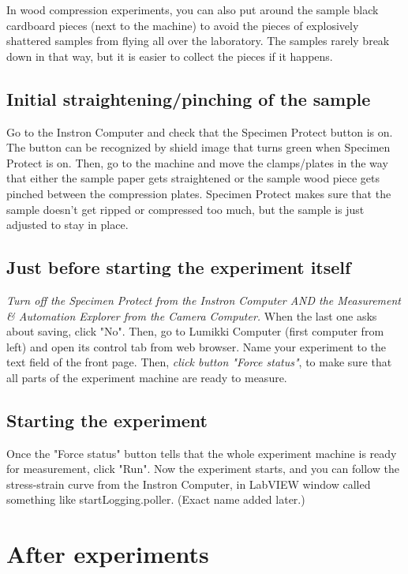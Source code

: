 \documentclass[a4paper]{article}
\begin{document}
In wood compression experiments, you can also put around the sample black cardboard 
pieces (next to the machine) to avoid the pieces of explosively shattered samples 
from flying all over the laboratory. The samples rarely break down in that way, 
but it is easier to collect the pieces if it happens.

\subsection{Initial straightening/pinching of the sample} 

Go to the Instron Computer and check that the Specimen Protect button is on. 
The button can be recognized by shield image that turns green when Specimen 
Protect is on. Then, go to the machine and move the clamps/plates in the way 
that either the sample paper gets straightened or the sample wood piece gets 
pinched between the compression plates. Specimen Protect makes sure that the 
sample doesn't get ripped or compressed too much, but the sample is just 
adjusted to stay in place.

\subsection{Just before starting the experiment itself} 

\textit{Turn off the Specimen Protect from the Instron Computer AND the Measurement 
\& Automation Explorer from the Camera Computer.} When the last one asks about 
saving, click "No". Then, go to Lumikki Computer (first computer from left) and 
open its control tab from web browser. Name your experiment to the text field of 
the front page. Then, \textit{click button "Force status"}, to make sure that all 
parts of the experiment machine are ready to measure. 

\subsection{Starting the experiment} 

Once the "Force status" button tells that the whole experiment machine is ready 
for measurement, click "Run". Now the experiment starts, and you can follow the 
stress-strain curve from the Instron Computer, in LabVIEW  window called something 
like startLogging.poller. (Exact name added later.)

\section{After experiments}
\end{document}
